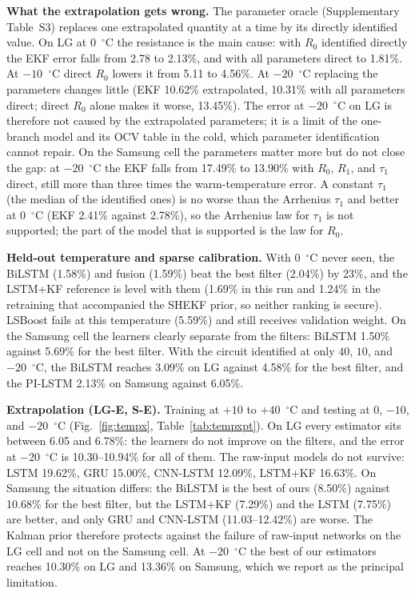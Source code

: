 \documentclass[journal]{IEEEtran}
\begin{document}
\textbf{What the extrapolation gets wrong.} The parameter oracle (Supplementary Table~S3) replaces one extrapolated quantity at a time by its directly identified value. On LG at $0$~$^\circ$C the resistance is the main cause: with $R_0$ identified directly the EKF error falls from 2.78 to 2.13\%, and with all parameters direct to 1.81\%. At $-10$~$^\circ$C direct $R_0$ lowers it from 5.11 to 4.56\%. At $-20$~$^\circ$C replacing the parameters changes little (EKF 10.62\% extrapolated, 10.31\% with all parameters direct; direct $R_0$ alone makes it worse, 13.45\%). The error at $-20$~$^\circ$C on LG is therefore not caused by the extrapolated parameters; it is a limit of the one-branch model and its OCV table in the cold, which parameter identification cannot repair. On the Samsung cell the parameters matter more but do not close the gap: at $-20$~$^\circ$C the EKF falls from 17.49\% to 13.90\% with $R_0$, $R_1$, and $\tau_1$ direct, still more than three times the warm-temperature error. A constant $\tau_1$ (the median of the identified ones) is no worse than the Arrhenius $\tau_1$ and better at $0$~$^\circ$C (EKF 2.41\% against 2.78\%), so the Arrhenius law for $\tau_1$ is not supported; the part of the model that is supported is the law for $R_0$.

\textbf{Held-out temperature and sparse calibration.} With $0$~$^\circ$C never seen, the BiLSTM (1.58\%) and fusion (1.59\%) beat the best filter (2.04\%) by 23\%, and the LSTM+KF reference is level with them (1.69\% in this run and 1.24\% in the retraining that accompanied the SHEKF prior, so neither ranking is secure). LSBoost fails at this temperature (5.59\%) and still receives validation weight. On the Samsung cell the learners clearly separate from the filters: BiLSTM 1.50\% against 5.69\% for the best filter. With the circuit identified at only $40$, $10$, and $-20$~$^\circ$C, the BiLSTM reaches 3.09\% on LG against 4.58\% for the best filter, and the PI-LSTM 2.13\% on Samsung against 6.05\%.

\textbf{Extrapolation (LG-E, S-E).} Training at $+10$ to $+40$~$^\circ$C and testing at $0$, $-10$, and $-20$~$^\circ$C (Fig.~\ref{fig:tempx}, Table~\ref{tab:tempxpt}). On LG every estimator sits between 6.05 and 6.78\%: the learners do not improve on the filters, and the error at $-20$~$^\circ$C is 10.30--10.94\% for all of them. The raw-input models do not survive: LSTM 19.62\%, GRU 15.00\%, CNN-LSTM 12.09\%, LSTM+KF 16.63\%. On Samsung the situation differs: the BiLSTM is the best of ours (8.50\%) against 10.68\% for the best filter, but the LSTM+KF (7.29\%) and the LSTM (7.75\%) are better, and only GRU and CNN-LSTM (11.03--12.42\%) are worse. The Kalman prior therefore protects against the failure of raw-input networks on the LG cell and not on the Samsung cell. At $-20$~$^\circ$C the best of our estimators reaches 10.30\% on LG and 13.36\% on Samsung, which we report as the principal limitation.
\end{document}
